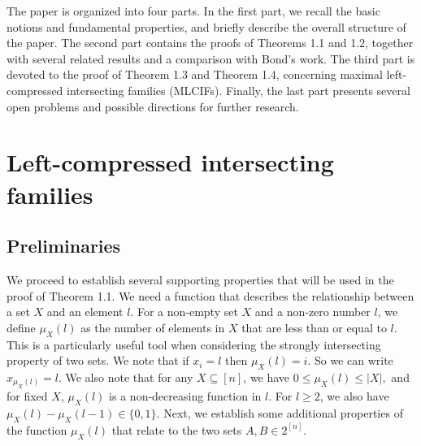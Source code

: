 \documentclass[reqno,english]{amsart}
\theoremstyle{plain}
\theoremstyle{remark}
\newcommand{\0}[0]{\emptyset}
\renewcommand{\1}[0]{\textbf{1}}
\theoremstyle{plain}
\theoremstyle{remark}
\renewcommand{\1}[0]{\textbf{1}}
\begin{document}
The paper is organized into four parts. In the first part, we recall the basic notions and fundamental properties, and briefly describe the overall structure of the paper. The second part contains the proofs of Theorems 1.1 and 1.2, together with several related results and a comparison with Bond’s work. The third part is devoted to the proof of Theorem 1.3 and Theorem 1.4, concerning maximal left-compressed intersecting families (MLCIFs). Finally, the last part presents several open problems and possible directions for further research.

\section{Left-compressed intersecting families}
\subsection{Preliminaries}
We proceed to establish several supporting properties that will be used in the proof of Theorem 1.1. We need a function that describes the relationship between a set $X$ and an element $l$. For a non-empty set $X$ and a non-zero number $l$, we define $\mu_{X}(l)$ as the number of elements in $X$ that are less than or equal to $l$. This is a particularly useful tool when considering the strongly intersecting property of two sets. We note that if $x_{i}= l$ then $\mu_{X}(l)=i$. So we can write $x_{\mu_{X}(l)}=l$. We also note that for any $X \subseteq [n]$, we have $0 \leq \mu_{X}(l) \leq |X|,$ and for fixed $X$, $\mu_{X}(l)$ is a non-decreasing function in $l$. For $l \geq 2$, we also have $\mu_{X}(l) - \mu_{X}(l-1) \in \{0,1\}$. Next, we establish some additional properties of the function $\mu_{X}(l)$ that relate to the two sets $A,B \in 2^{[n]}$.
\end{document}
